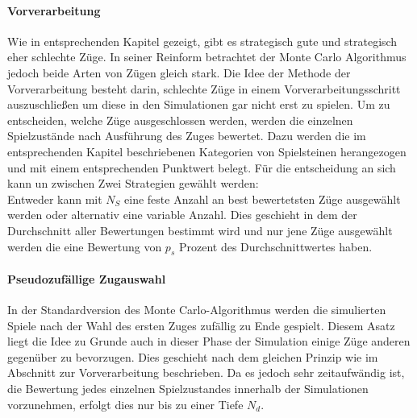 \paragraph{Vorverarbeitung}Wie in entsprechenden Kapitel gezeigt, gibt es strategisch gute und strategisch eher schlechte Züge. In seiner Reinform betrachtet der Monte Carlo Algorithmus jedoch beide Arten von Zügen gleich stark. Die Idee der Methode der Vorverarbeitung besteht darin, schlechte Züge in einem Vorverarbeitungsschritt auszuschließen um diese in den Simulationen gar nicht erst zu spielen. Um zu entscheiden, welche Züge ausgeschlossen werden, werden die einzelnen Spielzustände nach Ausführung des Zuges bewertet. Dazu werden die im entsprechenden Kapitel beschriebenen Kategorien von Spielsteinen herangezogen und mit einem entsprechenden Punktwert belegt. Für die entscheidung an sich kann un zwischen Zwei Strategien gewählt werden:\\
Entweder kann mit $N_{S}$ eine feste Anzahl an best bewertetsten Züge ausgewählt werden oder alternativ eine variable Anzahl. Dies geschieht in dem der Durchschnitt aller Bewertungen bestimmt wird und nur jene Züge ausgewählt werden die eine Bewertung von $p_{s}$ Prozent des Durchschnittwertes haben.
\paragraph{Pseudozufällige Zugauswahl}
In der Standardversion des Monte Carlo-Algorithmus werden die simulierten Spiele nach der Wahl des ersten Zuges zufällig zu Ende gespielt. Diesem Asatz liegt die Idee zu Grunde auch in dieser Phase der Simulation einige Züge anderen gegenüber zu bevorzugen. Dies geschieht nach dem gleichen Prinzip wie im Abschnitt zur Vorverarbeitung beschrieben. Da es jedoch sehr zeitaufwändig ist, die Bewertung jedes einzelnen Spielzustandes innerhalb der Simulationen vorzunehmen, erfolgt dies nur bis zu einer Tiefe $N_{d}$.
